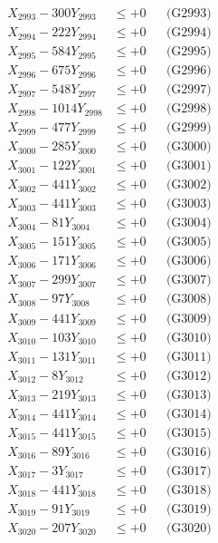 \documentclass[a4paper,10pt]{article}
\begin{document}
{\begin{align}
X_{2993} - 300Y_{2993} &\leq +0 && \text{(G2993)} \\
X_{2994} - 222Y_{2994} &\leq +0 && \text{(G2994)} \\
X_{2995} - 584Y_{2995} &\leq +0 && \text{(G2995)} \\
X_{2996} - 675Y_{2996} &\leq +0 && \text{(G2996)} \\
X_{2997} - 548Y_{2997} &\leq +0 && \text{(G2997)} \\
X_{2998} - 1014Y_{2998} &\leq +0 && \text{(G2998)} \\
X_{2999} - 477Y_{2999} &\leq +0 && \text{(G2999)} \\
X_{3000} - 285Y_{3000} &\leq +0 && \text{(G3000)} \\
\allowbreak
X_{3001} - 122Y_{3001} &\leq +0 && \text{(G3001)} \\
X_{3002} - 441Y_{3002} &\leq +0 && \text{(G3002)} \\
X_{3003} - 441Y_{3003} &\leq +0 && \text{(G3003)} \\
X_{3004} - 81Y_{3004} &\leq +0 && \text{(G3004)} \\
X_{3005} - 151Y_{3005} &\leq +0 && \text{(G3005)} \\
X_{3006} - 171Y_{3006} &\leq +0 && \text{(G3006)} \\
X_{3007} - 299Y_{3007} &\leq +0 && \text{(G3007)} \\
X_{3008} - 97Y_{3008} &\leq +0 && \text{(G3008)} \\
X_{3009} - 441Y_{3009} &\leq +0 && \text{(G3009)} \\
X_{3010} - 103Y_{3010} &\leq +0 && \text{(G3010)} \\
\allowbreak
X_{3011} - 131Y_{3011} &\leq +0 && \text{(G3011)} \\
X_{3012} - 8Y_{3012} &\leq +0 && \text{(G3012)} \\
X_{3013} - 219Y_{3013} &\leq +0 && \text{(G3013)} \\
X_{3014} - 441Y_{3014} &\leq +0 && \text{(G3014)} \\
X_{3015} - 441Y_{3015} &\leq +0 && \text{(G3015)} \\
X_{3016} - 89Y_{3016} &\leq +0 && \text{(G3016)} \\
X_{3017} - 3Y_{3017} &\leq +0 && \text{(G3017)} \\
X_{3018} - 441Y_{3018} &\leq +0 && \text{(G3018)} \\
X_{3019} - 91Y_{3019} &\leq +0 && \text{(G3019)} \\
X_{3020} - 207Y_{3020} &\leq +0 && \text{(G3020)} \\

\end{align}}
\end{document}
